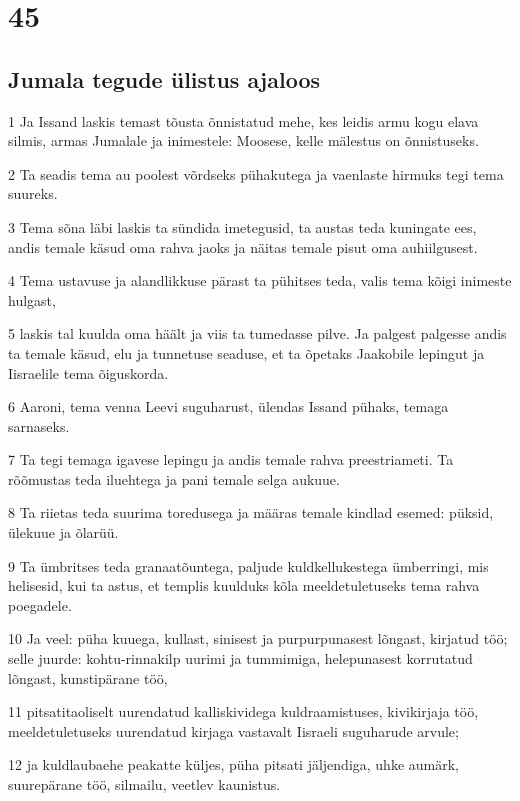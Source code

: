\chapter{45}

\section*{Jumala tegude ülistus ajaloos}

\par 1 Ja Issand laskis temast tõusta õnnistatud mehe, kes leidis armu kogu elava silmis, armas Jumalale ja inimestele: Moosese, kelle mälestus on õnnistuseks.
\par 2 Ta seadis tema au poolest võrdseks pühakutega ja vaenlaste hirmuks tegi tema suureks.
\par 3 Tema sõna läbi laskis ta sündida imetegusid, ta austas teda kuningate ees, andis temale käsud oma rahva jaoks ja näitas temale pisut oma auhiilgusest.
\par 4 Tema ustavuse ja alandlikkuse pärast ta pühitses teda, valis tema kõigi inimeste hulgast,
\par 5 laskis tal kuulda oma häält ja viis ta tumedasse pilve. Ja palgest palgesse andis ta temale käsud, elu ja tunnetuse seaduse, et ta õpetaks Jaakobile lepingut ja Iisraelile tema õiguskorda.
\par 6 Aaroni, tema venna Leevi suguharust, ülendas Issand pühaks, temaga sarnaseks.
\par 7 Ta tegi temaga igavese lepingu ja andis temale rahva preestriameti. Ta rõõmustas teda iluehtega ja pani temale selga aukuue.
\par 8 Ta riietas teda suurima toredusega ja määras temale kindlad esemed: püksid, ülekuue ja õlarüü.
\par 9 Ta ümbritses teda granaatõuntega, paljude kuldkellukestega ümberringi, mis helisesid, kui ta astus, et templis kuulduks kõla meeldetuletuseks tema rahva poegadele.
\par 10 Ja veel: püha kuuega, kullast, sinisest ja purpurpunasest lõngast, kirjatud töö; selle juurde: kohtu-rinnakilp uurimi ja tummimiga, helepunasest korrutatud lõngast, kunstipärane töö,
\par 11 pitsatitaoliselt uurendatud kalliskividega kuldraamistuses, kivikirjaja töö, meeldetuletuseks uurendatud kirjaga vastavalt Iisraeli suguharude arvule;
\par 12 ja kuldlaubaehe peakatte küljes, püha pitsati jäljendiga, uhke aumärk, suurepärane töö, silmailu, veetlev kaunistus.

